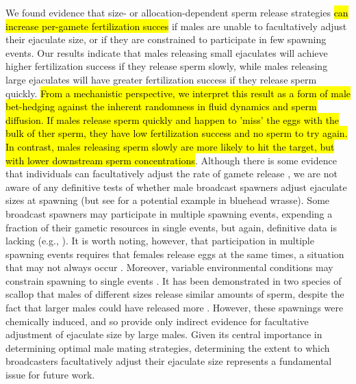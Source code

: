 \documentclass{article}
\begin{document}
We found evidence that size- or allocation-dependent sperm release strategies \hl{can increase per-gamete fertilization succes} if males are unable to facultatively adjust their ejaculate size, or if they are constrained to participate in few spawning events. Our results indicate that males releasing small ejaculates will achieve higher fertilization success if they release sperm slowly, while males releasing large ejaculates will have greater fertilization success if they release sperm quickly. \hl{From a mechanistic perspective, we interpret this result as a form of male bet-hedging against the inherent randomness in fluid dynamics and sperm diffusion. If males release sperm quickly and happen to 'miss' the eggs with the bulk of ther sperm, they have low fertilization success and no sperm to try again. In contrast, males releasing sperm slowly are more likely to hit the target, but with lower downstream sperm concentrations}. Although there is some evidence that individuals can facultatively adjust the rate of gamete release \citep{Marshall2004}, we are not aware of any definitive tests of whether male broadcast spawners adjust ejaculate sizes at spawning (but see \citealt{PetersenEtAl2001} for a potential example in bluehead wrasse). Some broadcast spawners may participate in multiple spawning events, expending a fraction of their gametic resources in single events, but again, definitive data is lacking (e.g., \citealt{Levitan1988,McEuan1988,LotterhosLevitan2011}). It is worth noting, however, that participation in multiple spawning events requires that females release eggs at the same times, a situation that may not always occur \citep{Olito2015,Olito2017}. Moreover, variable environmental conditions may constrain spawning to single events \citep{Olito2015,Olito2017}. It has been demonstrated in two species of scallop that males of different sizes release similar amounts of sperm, despite the fact that larger males could have released more \citep{Styan2003}. However, these spawnings were chemically induced, and so provide only indirect evidence for facultative adjustment of ejaculate size by large males. Given its central importance in determining optimal male mating strategies, determining the extent to which broadcasters facultatively adjust their ejaculate size represents a fundamental issue for future work.
\end{document}
